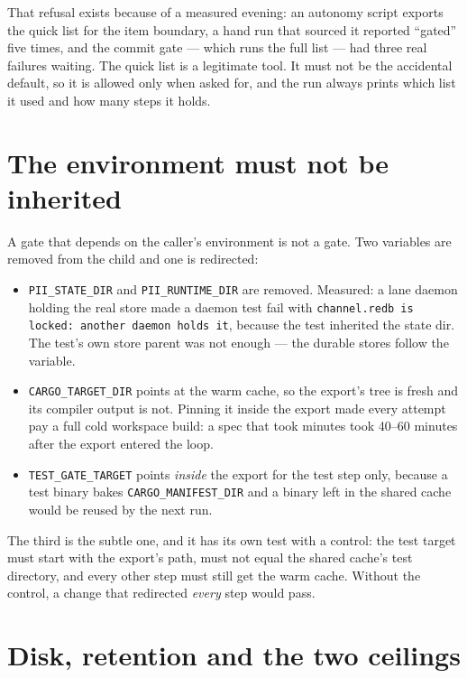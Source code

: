 That refusal exists because of a measured evening: an autonomy script exports the quick list
for the item boundary, a hand run that sourced it reported ``gated'' five times, and the
commit gate --- which runs the full list --- had three real failures waiting. The quick list
is a legitimate tool. It must not be the accidental default, so it is allowed only when asked
for, and the run always prints which list it used and how many steps it holds.

\section{The environment must not be inherited}

A gate that depends on the caller's environment is not a gate. Two variables are removed from
the child and one is redirected:

\begin{itemize}
	\item \texttt{PII\_STATE\_DIR} and \texttt{PII\_RUNTIME\_DIR} are removed. Measured: a lane
	daemon holding the real store made a daemon test fail with \texttt{channel.redb is locked:
	another daemon holds it}, because the test inherited the state dir. The test's own store
	parent was not enough --- the durable stores follow the variable.
	\item \texttt{CARGO\_TARGET\_DIR} points at the warm cache, so the export's tree is fresh
	and its compiler output is not. Pinning it inside the export made every attempt pay a full
	cold workspace build: a spec that took minutes took 40--60 minutes after the export entered
	the loop.
	\item \texttt{TEST\_GATE\_TARGET} points \emph{inside} the export for the test step only,
	because a test binary bakes \texttt{CARGO\_MANIFEST\_DIR} and a binary left in the shared
	cache would be reused by the next run.
\end{itemize}

The third is the subtle one, and it has its own test with a control: the test target must
start with the export's path, must not equal the shared cache's test directory, and every
other step must still get the warm cache. Without the control, a change that redirected
\emph{every} step would pass.

\section{Disk, retention and the two ceilings}

